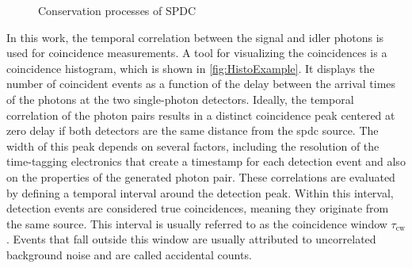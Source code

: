 \begin{figure}[!bt]
{
	}%
	
	\caption{Conservation processes of SPDC}
	\label{fig:SPDC}
\end{figure} \newline
In this work, the temporal correlation between the signal and idler photons is used for coincidence measurements. A tool for visualizing the coincidences is a coincidence histogram, which is shown in \autoref{fig:HistoExample}. It displays the number of coincident events as a function of the delay between the arrival times of the photons at the two single-photon detectors. \newline
Ideally, the temporal correlation of the photon pairs results in a distinct coincidence peak centered at zero delay if both detectors are the same distance from the \acrshort{spdc} source. 
The width of this peak depends on several factors, including the resolution of the time-tagging electronics that create a timestamp for each detection event and also on the properties of the generated photon pair. \newline
These correlations are evaluated by defining a temporal interval around the detection peak. Within this interval, detection events are considered true coincidences, meaning they originate from the same source. This interval is usually referred to as the coincidence window $\tau_{\text{cw}}$. Events that fall outside this window are usually attributed to uncorrelated background noise and are called accidental counts. 
